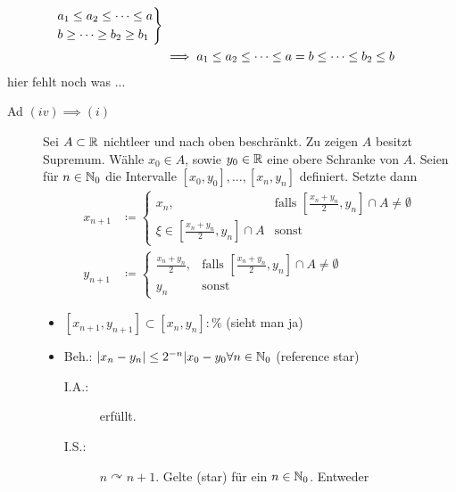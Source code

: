 \documentclass[consecutivenumbering]{gadsescript}
\begin{document}
\begin{subtheorem}
\begin{subproof*}
\begin{description}
\begin{align*}
					\begin{drcases}
						a_1 \leq a_2 \leq \dotsb \leq a\\
						b  \geq \dotsb \geq b_2 \geq b_1
					\end{drcases}\\
					&\implies a_1 \leq a_2 \leq \dotsb \leq a = b \leq \dotsb \leq b_2 \leq b
				\end{align*}
				hier fehlt noch was ...
		\end{description}
	\end{subproof*}
	\begin{subproof-headless}
		\begin{description}
			\item[Ad $(iv) \implies (i)$] Sei $ A \subset \mathbb{R} $ nichtleer und nach oben beschränkt. Zu zeigen $ A $ besitzt Supremum. Wähle $ x_0 \in A $, sowie $ y_0 \in \mathbb{R} $ eine obere Schranke von $ A $. Seien für $ n \in \mathbb{N}_0 $ die Intervalle $ [x_0, y_0], \dotsc, [x_n, y_n] $ definiert. Setzte dann
				\begin{align*}
					x_{n+1} &\coloneqq%
					\begin{cases}%
						x_n, & \text{falls } [\frac{x_n+y_n}{2}, y_n] \cap A \neq \emptyset\\
						\xi \in [\frac{x_n + y_n}{2}, y_n] \cap A & \text{sonst}
					\end{cases}\\
					y_{n+1} &\coloneqq%
					\begin{cases}%
						\frac{x_n + y_n}{2}, & \text{falls } [\frac{x_n+y_n}{2}, y_n] \cap A \neq \emptyset\\
						y_n & \text{sonst}
					\end{cases}%
				\end{align*}
				\begin{itemize}
					\item $[x_{n+1}, y_{n+1}] \subset [x_n, y_n] : \%$ (sieht man ja)
					\item Beh.: $ | x_n - y_n | \leq 2^{-n} | x_0 - y_0 \forall n \in \mathbb{N}_0 $ (reference star)
						\begin{description}
							\item[I.A.:] erfüllt.
							\item[I.S.:] $ n \curvearrowright n+1 $. Gelte (star) für ein $ n \in \mathbb{N}_0 $. Entweder
								\begin{enumerate}[label=(\alph*)]

\end{enumerate}
\end{description}
\end{itemize}
\end{description}
\end{subproof-headless}
\end{subtheorem}
\end{document}
